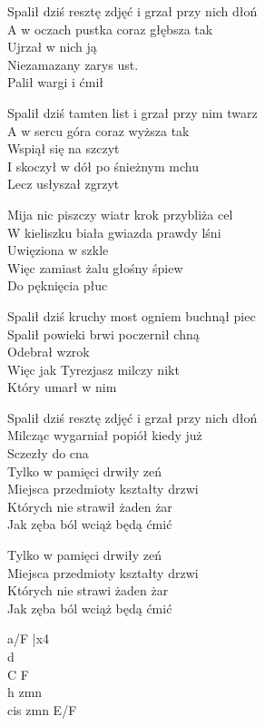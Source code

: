 \begin{text}
    Spalił dziś resztę zdjęć i grzał przy nich dłoń\\
    A w oczach pustka coraz głębsza tak\\
    Ujrzał w nich ją\\
    Niezamazany zarys ust.\\
    Palił wargi i ćmił

    Spalił dziś tamten list i grzał przy nim twarz\\
    A w sercu góra coraz wyższa tak\\
    Wspiął się na szczyt\\
    I skoczył w dół po śnieżnym mchu\\
    Lecz usłyszał zgrzyt

    Mija nic piszczy wiatr krok przybliża cel\\
    W kieliszku biała gwiazda prawdy lśni\\
    Uwięziona w szkle\\
    Więc zamiast żalu głośny śpiew\\
    Do pęknięcia płuc

    Spalił dziś kruchy most ogniem buchnął piec\\
    Spalił powieki brwi poczernił chną\\
    Odebrał wzrok\\
    Więc jak Tyrezjasz milczy nikt\\
    Który umarł w nim

    Spalił dziś resztę zdjęć i grzał przy nich dłoń\\
    Milcząc wygarniał popiół kiedy już\\
    Sczezły do cna\\
    Tylko w pamięci drwiły zeń\\
    Miejsca przedmioty kształty drzwi\\
    Których nie strawił żaden żar\\
    Jak zęba ból wciąż będą ćmić

    Tylko w pamięci drwiły zeń\\
    Miejsca przedmioty kształty drzwi\\
    Których nie strawi żaden żar\\
    Jak zęba ból wciąż będą ćmić
\end{text}
\begin{chord}
    a/F |x4\\
    d\\
    C F\\
    h zmn\\
    cis zmn E/F
\end{chord}